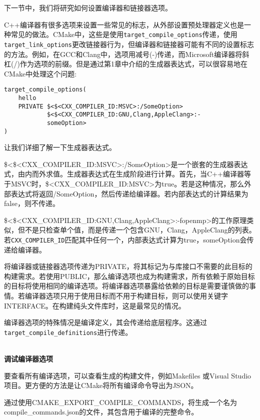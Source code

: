 下一节中，我们将研究如何设置编译器和链接器选项。


C++编译器有很多选项来设置一些常见的标志，从外部设置预处理器定义也是一种常见的做法。CMake中，这些是使用\texttt{target\_compile\_options}传递，使用\texttt{target\_link\_options}更改链接器行为，但编译器和链接器可能有不同的设置标志的方法。例如，在GCC和Clang中，选项用减号(-)传递，而Microsoft编译器将斜杠(/)作为选项的前缀。但是通过第1章中介绍的生成器表达式，可以很容易地在CMake中处理这个问题:

\begin{lstlisting}[style=styleCMake]
target_compile_options(
	hello
	PRIVATE $<$<CXX_COMPILER_ID:MSVC>:/SomeOption>
			$<$<CXX_COMPILER_ID:GNU,Clang,AppleClang>:-
			someOption>
)
\end{lstlisting}

让我们详细了解一下生成器表达式。

\$<\$<CXX\_COMPILER\_ID:MSVC>:/SomeOption>是一个嵌套的生成器表达式，由内而外求值。生成器表达式在生成阶段进行计算。首先，当C++编译器等于MSVC时，\$<CXX\_COMPILER\_ID:MSVC>为true。若是这种情况，那么外部表达式将返回/SomeOption，然后传递给编译器。若内部表达式的计算结果为false，则不传递。

\$<\$<CXX\_COMPILER\_ID:GNU,Clang,AppleClang>:-fopenmp>的工作原理类似，但不是只检查单个值，而是传递一个包含GNU，Clang，AppleClang的列表。若\texttt{CXX\_COMPILER\_ID}匹配其中任何一个，内部表达式计算为true，someOption会传递给编译器。

将编译器或链接器选项传递为PRIVATE，将其标记为与库接口不需要的此目标的构建需求。若使用PUBLIC，那么编译选项也成为构建需求，所有依赖于原始目标的目标将使用相同的编译选项。将编译器选项暴露给依赖的目标是需要谨慎做的事情。若编译器选项只用于使用目标而不用于构建目标，则可以使用关键字INTERFACE。在构建纯头文件库时，这是最常见的情况。

编译器选项的特殊情况是编译定义，其会传递给底层程序。这通过\texttt{target\_compile\_definitions}进行传递。

\hspace*{\fill} \\ %
\noindent
\textbf{调试编译器选项}

要查看所有编译选项，可以查看生成的构建文件，例如Makefiles 或Visual Studio项目。更方便的方法是让CMake将所有编译命令导出为JSON。

通过使用CMAKE\_EXPORT\_COMPILE\_COMMANDS，将生成一个名为compile\_commands.json的文件，其包含用于编译的完整命令。

